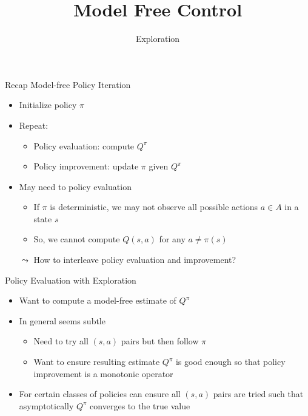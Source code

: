 \documentclass[aspectratio=169]{../latex_main/tntbeamer}  %
\title[RL: Model Free Control]{Model Free Control}
\subtitle{Exploration}
\begin{document}
	
	\maketitle

\begin{frame}[c]{Recap Model-free Policy Iteration}
	
	\begin{itemize}
		\item Initialize policy $\pi$
		\item Repeat:
		\begin{itemize}
			\item Policy evaluation: compute $Q^\pi$
			\item Policy improvement: update $\pi$ given $Q^\pi$
		\end{itemize}
		\bigskip
		\pause
		\item May need to policy evaluation 
		\begin{itemize}
			\item If $\pi$ is deterministic, we may not observe all possible actions $a\in A$ in a state $s$
			\item So, we cannot compute $Q(s,a)$ for any $a \neq \pi(s)$
		\end{itemize}
		\pause
		\item[$\leadsto$] How to interleave policy evaluation and improvement?
	\end{itemize}

\end{frame}
\begin{frame}[c]{Policy Evaluation with Exploration}
	
	\begin{itemize}
		\item Want to compute a model-free estimate of $Q^\pi$
		\item In general seems subtle
		\begin{itemize}
			\item Need to try all $(s,a)$ pairs but then follow $\pi$
			\item Want to ensure resulting estimate $Q^\pi$ is good enough so that policy
			improvement is a monotonic operator
		\end{itemize}
		\item For certain classes of policies can ensure all $(s,a)$ pairs are tried such
		that asymptotically $Q^\pi$ converges to the true value
	\end{itemize}
	
\end{frame}
\end{document}
